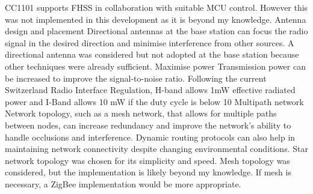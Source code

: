 CC1101 supports FHSS in collaboration with suitable MCU control. However this was not implemented in this development as it is beyond my knowledge.
Antenna design and placement
Directional antennas at the base station can focus the radio signal in the desired direction and minimise interference from other sources. 
A directional antenna was considered but not adopted at the base station because other techniques were already sufficient.
Maximise power
Transmission power can be increased to improve the signal-to-noise ratio. 
Following the current Switzerland
Radio Interface Regulation, 
H-band allows 1mW effective
radiated power and I-Band allows 10 mW if the duty cycle is below 10%
Multipath network
Network topology, such as a mesh network, that allows for multiple paths between nodes, can increase redundancy and improve the network's ability to handle occlusions and interference. Dynamic routing protocols can also help in maintaining network connectivity despite changing environmental conditions.
Star network topology was chosen for its simplicity and speed. Mesh topology was considered, but the implementation is likely beyond my knowledge. If mesh is necessary, a ZigBee implementation would be more appropriate.


